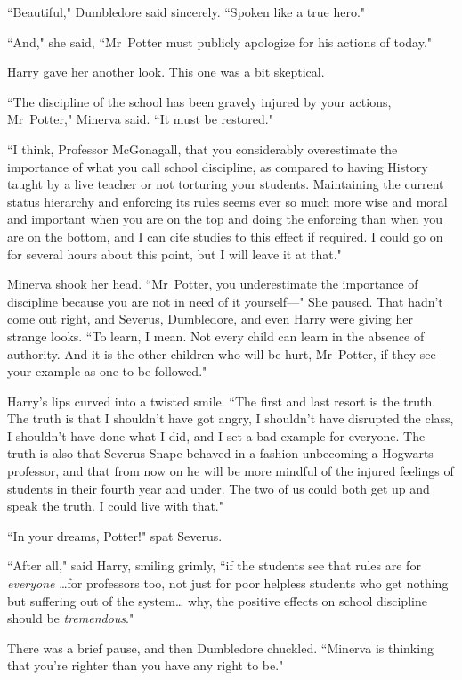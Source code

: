 ``Beautiful," Dumbledore said sincerely. ``Spoken like a true hero."

``And," she said, ``Mr~Potter must publicly apologize for his actions of today."

Harry gave her another look. This one was a bit skeptical.

``The discipline of the school has been gravely injured by your actions, Mr~Potter," Minerva said. ``It must be restored."

``I think, Professor McGonagall, that you considerably overestimate the importance of what you call school discipline, as compared to having History taught by a live teacher or not torturing your students. Maintaining the current status hierarchy and enforcing its rules seems ever so much more wise and moral and important when you are on the top and doing the enforcing than when you are on the bottom, and I can cite studies to this effect if required. I could go on for several hours about this point, but I will leave it at that."

Minerva shook her head. ``Mr~Potter, you underestimate the importance of discipline because you are not in need of it yourself—" She paused. That hadn't come out right, and Severus, Dumbledore, and even Harry were giving her strange looks. ``To learn, I mean. Not every child can learn in the absence of authority. And it is the other children who will be hurt, Mr~Potter, if they see your example as one to be followed."

Harry's lips curved into a twisted smile. ``The first and last resort is the truth. The truth is that I shouldn't have got angry, I shouldn't have disrupted the class, I shouldn't have done what I did, and I set a bad example for everyone. The truth is also that Severus Snape behaved in a fashion unbecoming a Hogwarts professor, and that from now on he will be more mindful of the injured feelings of students in their fourth year and under. The two of us could both get up and speak the truth. I could live with that."

``In your dreams, Potter!" spat Severus.

``After all," said Harry, smiling grimly, ``if the students see that rules are for \emph{everyone} {\ldots}for professors too, not just for poor helpless students who get nothing but suffering out of the system{\ldots} why, the positive effects on school discipline should be \emph{tremendous}."

There was a brief pause, and then Dumbledore chuckled. ``Minerva is thinking that you're righter than you have any right to be."

